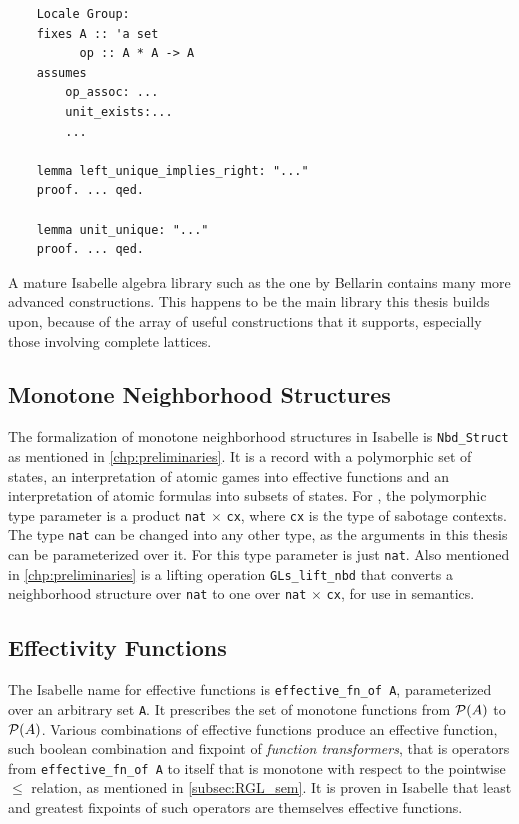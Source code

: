 \begin{verbatim}
    Locale Group:
    fixes A :: 'a set
          op :: A * A -> A
    assumes 
        op_assoc: ...
        unit_exists:...
        ...

    lemma left_unique_implies_right: "..."
    proof. ... qed.
    
    lemma unit_unique: "..."
    proof. ... qed.
\end{verbatim}

A mature Isabelle algebra library such as the one by Bellarin \cite{HOL-Alg} contains many more advanced constructions. This happens to be the main library this thesis builds upon, because of the array of useful constructions that it supports, especially those involving complete lattices. 
\label{sec:formal_semantics}

\subsection{Monotone Neighborhood Structures}
The formalization of monotone neighborhood structures in Isabelle is \texttt{Nbd\_Struct} as mentioned in \autoref{chp:preliminaries}. It is a record with a polymorphic set of states, an interpretation of atomic games into effective functions and an interpretation of atomic formulas into subsets of states. For \GLs{}, the polymorphic type parameter is a product \texttt{nat} $\times$ \texttt{cx}, where \texttt{cx} is the type of sabotage contexts. The type \texttt{nat} can be changed into any other type, as the arguments in this thesis can be parameterized over it. For \RGL{} this type parameter is just \texttt{nat}. Also mentioned in \autoref{chp:preliminaries} is a lifting operation \texttt{GLs\_lift\_nbd} that converts a neighborhood structure over \texttt{nat} to one over \texttt{nat} $\times$ \texttt{cx}, for use in \GLs{} semantics.

\subsection{Effectivity Functions}
The Isabelle name for effective functions is \texttt{effective\_fn\_of A}, parameterized over an arbitrary set \texttt{A}. It prescribes the set of monotone functions from $\mathcal{P} (A)$ to $\mathcal{P} (A)$. Various combinations of effective functions produce an effective function, such boolean combination and fixpoint of \textit{function transformers}, that is operators from \texttt{effective\_fn\_of A} to itself that is monotone with respect to the pointwise $\leq$ relation, as mentioned in \autoref{subsec:RGL_sem}. It is proven in Isabelle that least and greatest fixpoints of such operators are themselves effective functions.

